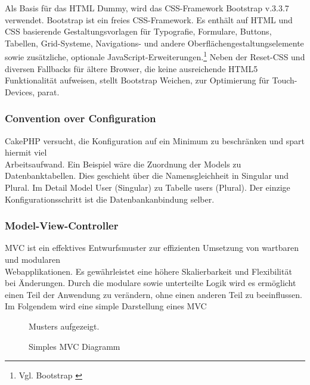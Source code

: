 Als Basis für das HTML Dummy, wird das CSS-Framework
Bootstrap v.3.3.7 verwendet.
Bootstrap ist ein freies CSS-Framework. Es enthält auf HTML und CSS basierende
Gestaltungsvorlagen für Typografie, Formulare, Buttons, Tabellen, Grid-Systeme, 
Navigations- und andere Oberflächengestaltungselemente sowie zusätzliche, 
optionale JavaScript-Erweiterungen.\footnote{Vgl. Bootstrap
\cite{wiki:Bootstrap_(Framework)}} Neben der Reset-CSS und diversen Fallbacks
für ältere Browser, die keine ausreichende HTML5 Funktionalität aufweisen, stellt Bootstrap Weichen,
\zB zur Optimierung für Touch-Devices, parat. 

\subsubsection{Convention over Configuration}
\label{sec:CoC}
CakePHP versucht, die Konfiguration auf ein Minimum zu beschränken und
spart hiermit viel \\ Arbeitsaufwand. Ein Beispiel wäre die Zuordnung der Models
zu Datenbanktabellen. Dies geschieht über die Namensgleichheit in Singular und Plural. 
Im Detail Model User (Singular) zu Tabelle users (Plural). Der einzige
Konfigurationsschritt ist die Datenbankanbindung selber.


\subsubsection{Model-View-Controller}
\label{sec:MVC}
\ac{MVC} ist ein effektives Entwurfsmuster zur effizienten Umsetzung von 
wartbaren und modularen \\ Webapplikationen. Es gewährleistet eine höhere
Skalierbarkeit und Flexibilität bei Änderungen. Durch die modulare sowie
unterteilte Logik wird es ermöglicht einen Teil der Anwendung zu
verändern, ohne einen anderen Teil zu beeinflussen. Im Folgendem wird eine
simple Darstellung eines \ac{MVC} \begin{figure}[htb] Musters aufgezeigt.
\label{MVC-Diagramm}
\caption{Simples MVC Diagramm}
\end{figure}




